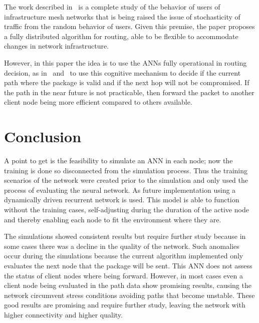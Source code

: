 \documentclass[10pt, conference, compsocconf]{IEEEtran}
\begin{document}
The work described in~\cite{Song:5072224} is a complete study of the behavior of users of infrastructure mesh networks that is being raised the issue of stochasticity of traffic from the random behavior of users. Given this premise, the paper proposes a fully distributed algorithm for routing, able to be flexible to accommodate changes in network infrastructure.

However, in this paper the idea is to use the ANNs fully operational in routing decision, as in~\cite{Zhi:5364647} and~\cite{Venkataram:2002:NNB:638963.638974} to use this cognitive mechanism to decide if the current path where the package is valid and if the next hop will not be compromised. If the path in the near future is not practicable, then forward the packet to another client node being more efficient compared to others available.

\section{Conclusion}\label{sec:con}

A point to get is the feasibility to simulate an ANN in each node; now the training is done so disconnected from the simulation process. Thus the training scenarios of the network were created prior to the simulation and only used the process of evaluating the neural network. As future implementation using a dynamically driven recurrent network is used. This model is able to function without the training cases, self-adjusting during the duration of the active node and thereby enabling each node to fit the environment where they are.

The simulations showed consistent results but require further study because in some cases there was a decline in the quality of the network. Such anomalies occur during the simulations because the current algorithm implemented only evaluates the next node that the package will be sent. This ANN does not assess the status of client nodes where being forward. However, in most cases even a client node being evaluated in the path data show promising results, causing the network circumvent stress conditions avoiding paths that become unstable. These good results are promising and require further study, leaving the network with higher connectivity and higher quality.

\end{document}
